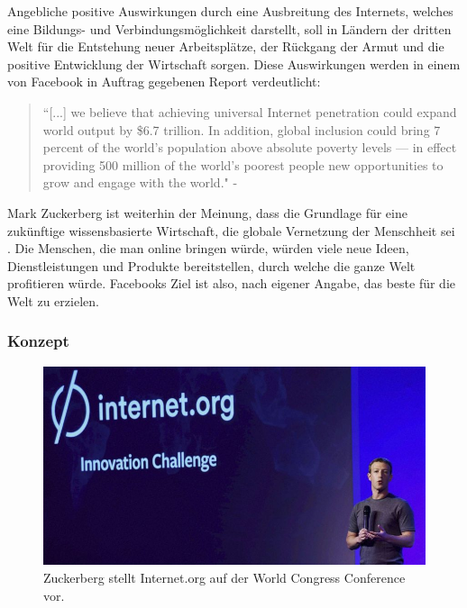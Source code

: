 \documentclass{article}
\begin{document}
Angebliche positive Auswirkungen durch eine Ausbreitung des Internets, welches eine Bildungs- und Verbindungsmöglichkeit darstellt, soll in Ländern der dritten Welt für die Entstehung neuer Arbeitsplätze, der Rückgang der Armut und die positive Entwicklung der Wirtschaft sorgen.
Diese Auswirkungen werden in einem von Facebook in Auftrag gegebenen Report verdeutlicht:

\begin{quote}
``[...] we believe that achieving universal Internet penetration could expand world output by \$6.7 trillion.  
In addition, global inclusion could bring 7 percent of the world’s population above absolute poverty levels — in effect providing 500 
million of the world’s poorest people new opportunities to grow and engage with the world." - \cite[11]{connectWorld}
\end{quote}

Mark Zuckerberg ist weiterhin der Meinung, dass die Grundlage für eine zukünftige wissensbasierte Wirtschaft, die globale Vernetzung der Menschheit sei \parencite{HumanRight}.
Die Menschen, die man online bringen würde, würden viele neue Ideen, Dienstleistungen und Produkte bereitstellen, durch welche die ganze Welt profitieren würde.
Facebooks Ziel ist also, nach eigener Angabe, das beste für die Welt zu erzielen.

\subsubsection{Konzept}

 \begin{figure}[h!]
  \begin{center}
    \includegraphics[scale=0.5]{orgConf}
    \caption{Zuckerberg stellt Internet.org auf der World Congress Conference vor\autocite{orgConf}.}
  \end{center}
\end{figure}
       
\end{document}
